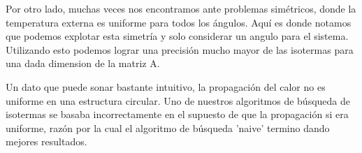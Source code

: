 Por otro lado, muchas veces nos encontramos ante problemas simétricos, donde la temperatura externa es uniforme para todos los ángulos. Aquí es donde notamos que podemos explotar esta simetría y solo considerar un angulo para el sistema. Utilizando esto podemos lograr una precisión mucho mayor de las isotermas para una dada dimension de la matriz A.

Un dato que puede sonar bastante intuitivo, la propagación del calor no es uniforme en una estructura circular. Uno de nuestros algoritmos de búsqueda de isotermas se basaba incorrectamente en el supuesto de que la propagación si era uniforme, razón por la cual el algoritmo de búsqueda 'naive' termino dando mejores resultados.
